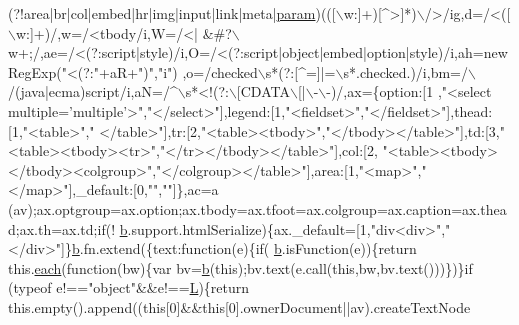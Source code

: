 \begin{DoxyCode}
      (?!area|br|col|embed|hr|img|input|link|meta|\hyperlink{structparam}{param})(([\(\backslash\)w:]+)[^>]*)\(\backslash\)/>/ig,d=/<([\(\backslash\)w:]+)/,w=/<tbody/i,W=/<|
      &#?\(\backslash\)w+;/,ae=/<(?:script|style)/i,O=/<(?:script|\textcolor{keywordtype}{object}|embed|option|style)/i,ah=\textcolor{keyword}{new} RegExp(\textcolor{stringliteral}{"<(?:"}+aR+\textcolor{stringliteral}{")"},\textcolor{stringliteral}{"i"})
      ,o=/checked\(\backslash\)s*(?:[^=]|=\(\backslash\)s*.checked.)/i,bm=/\(\backslash\)/(java|ecma)script/i,aN=/^\(\backslash\)s*<!(?:\(\backslash\)[CDATA\(\backslash\)[|\(\backslash\)-\(\backslash\)-)/,ax=\{option:[1
      ,\textcolor{stringliteral}{"<select multiple='multiple'>"},\textcolor{stringliteral}{"</select>"}],legend:[1,\textcolor{stringliteral}{"<fieldset>"},\textcolor{stringliteral}{"</fieldset>"}],thead:[1,\textcolor{stringliteral}{"<table>"},\textcolor{stringliteral}{"
      </table>"}],tr:[2,\textcolor{stringliteral}{"<table><tbody>"},\textcolor{stringliteral}{"</tbody></table>"}],td:[3,\textcolor{stringliteral}{"<table><tbody><tr>"},\textcolor{stringliteral}{"</tr></tbody></table>"}],col:[2,\textcolor{stringliteral}{
      "<table><tbody></tbody><colgroup>"},\textcolor{stringliteral}{"</colgroup></table>"}],area:[1,\textcolor{stringliteral}{"<map>"},\textcolor{stringliteral}{"</map>"}],\_default:[0,\textcolor{stringliteral}{""},\textcolor{stringliteral}{""}]\},ac=a
      (av);ax.optgroup=ax.option;ax.tbody=ax.tfoot=ax.colgroup=ax.caption=ax.thead;ax.th=ax.td;\textcolor{keywordflow}{if}(!
      \hyperlink{docs_2_programmer's_manual_2html_2jquery_8js_aa4026ad5544b958e54ce5e106fa1c805}{b}.support.htmlSerialize)\{ax.\_default=[1,\textcolor{stringliteral}{"div<div>"},\textcolor{stringliteral}{"</div>"}]\}\hyperlink{docs_2_programmer's_manual_2html_2jquery_8js_aa4026ad5544b958e54ce5e106fa1c805}{b}.fn.extend(\{text:\textcolor{keyword}{function}(e)\{\textcolor{keywordflow}{if}(
      \hyperlink{docs_2_programmer's_manual_2html_2jquery_8js_aa4026ad5544b958e54ce5e106fa1c805}{b}.isFunction(e))\{\textcolor{keywordflow}{return} this.\hyperlink{docs_2_programmer's_manual_2html_2jquery_8js_a871ff39db627c54c710a3e9909b8234c}{each}(\textcolor{keyword}{function}(bw)\{var bv=\hyperlink{docs_2_programmer's_manual_2html_2jquery_8js_aa4026ad5544b958e54ce5e106fa1c805}{b}(\textcolor{keyword}{this});bv.text(e.call(\textcolor{keyword}{this},bw,bv.text()))\})\}\textcolor{keywordflow}{if}
      (typeof e!==\textcolor{stringliteral}{"object"}&&e!==\hyperlink{docs_2_programmer's_manual_2html_2jquery_8js_a38ee4c0b5f4fe2a18d0c783af540d253}{L})\{\textcolor{keywordflow}{return} this.empty().append((\textcolor{keyword}{this}[0]&&\textcolor{keyword}{this}[0].ownerDocument||av).createTextNode

\end{DoxyCode}
